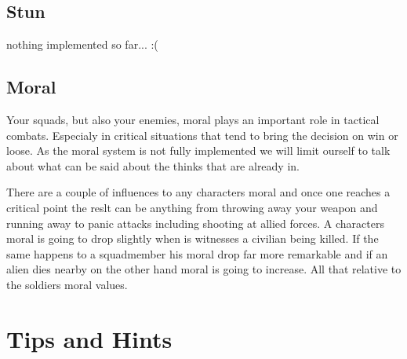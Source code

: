 \subsection{Stun}
nothing implemented so far... :(

\subsection{Moral}
Your squads, but also your enemies, moral plays an important role in tactical combats. Especialy in critical situations that tend to bring the decision on win or loose. As the moral system is not fully implemented we will limit ourself to talk about what can be said about the thinks that are already in. 

There are a couple of influences to any characters moral and once one reaches a critical point the reslt can be anything from throwing away your weapon and running away to panic attacks including shooting at allied forces.
A characters moral is going to drop slightly when is witnesses a civilian being killed. If the same happens to a squadmember his moral drop far more remarkable and if an alien dies nearby on the other hand moral is going to increase. All that relative to the soldiers moral values.

\section{Tips and Hints}
